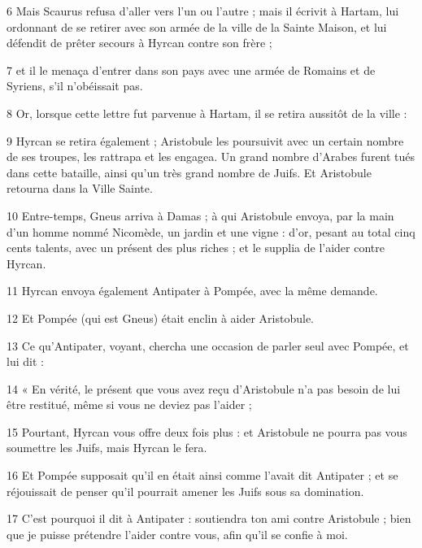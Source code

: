 \par 6 Mais Scaurus refusa d'aller vers l'un ou l'autre ; mais il écrivit à Hartam, lui ordonnant de se retirer avec son armée de la ville de la Sainte Maison, et lui défendit de prêter secours à Hyrcan contre son frère ;

\par 7 et il le menaça d'entrer dans son pays avec une armée de Romains et de Syriens, s'il n'obéissait pas.

\par 8 Or, lorsque cette lettre fut parvenue à Hartam, il se retira aussitôt de la ville :

\par 9 Hyrcan se retira également ; Aristobule les poursuivit avec un certain nombre de ses troupes, les rattrapa et les engagea. Un grand nombre d'Arabes furent tués dans cette bataille, ainsi qu'un très grand nombre de Juifs. Et Aristobule retourna dans la Ville Sainte.

\par 10 Entre-temps, Gneus arriva à Damas ; à qui Aristobule envoya, par la main d'un homme nommé Nicomède, un jardin et une vigne : d'or, pesant au total cinq cents talents, avec un présent des plus riches ; et le supplia de l'aider contre Hyrcan.

\par 11 Hyrcan envoya également Antipater à Pompée, avec la même demande.

\par 12 Et Pompée (qui est Gneus) était enclin à aider Aristobule.

\par 13 Ce qu'Antipater, voyant, chercha une occasion de parler seul avec Pompée, et lui dit :

\par 14 « En vérité, le présent que vous avez reçu d'Aristobule n'a pas besoin de lui être restitué, même si vous ne deviez pas l'aider ;

\par 15 Pourtant, Hyrcan vous offre deux fois plus : et Aristobule ne pourra pas vous soumettre les Juifs, mais Hyrcan le fera.

\par 16 Et Pompée supposait qu'il en était ainsi comme l'avait dit Antipater ; et se réjouissait de penser qu'il pourrait amener les Juifs sous sa domination.

\par 17 C'est pourquoi il dit à Antipater : soutiendra ton ami contre Aristobule ; bien que je puisse prétendre l'aider contre vous, afin qu'il se confie à moi.

